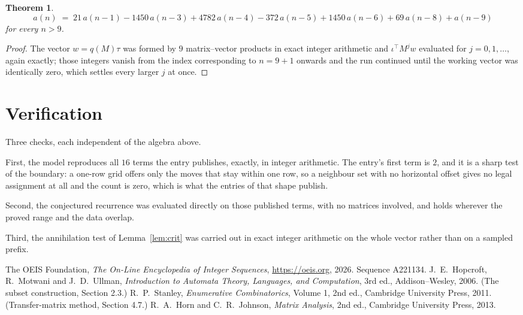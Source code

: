 \documentclass[11pt,a4paper]{article}
\theoremstyle{plain}
\newtheorem{theorem}{Theorem}
\theoremstyle{definition}
\begin{document}
\begin{theorem}
\[
a(n)\;=\;21\,a(n-1) - 1450\,a(n-3) + 4782\,a(n-4) - 372\,a(n-5) + 1450\,a(n-6) + 69\,a(n-8) + a(n-9)
\]
for every $n>9$.
\end{theorem}

\begin{proof}
The vector $w=q(M)\tau$ was formed by $9$ matrix--vector products in exact integer
arithmetic and $\iota^{\!\top}M^{j}w$ evaluated for $j=0,1,\dots$, again exactly; those
integers vanish from the index corresponding to $n=9+1$ onwards and the run continued
until the working vector was identically zero, which settles every larger $j$ at once.
\end{proof}

\section{Verification}

Three checks, each independent of the algebra above.

First, the model reproduces all $16$ terms the entry publishes, exactly, in integer
arithmetic. The entry's first term is $2$, and it is a sharp test of the boundary: a
one-row grid offers only the moves that stay within one row, so a neighbour set with no
horizontal offset gives no legal assignment at all and the count is zero, which is what the
entries of that shape publish.

Second, the conjectured recurrence was evaluated directly on those published terms, with no
matrices involved, and holds wherever the proved range and the data overlap.

Third, the annihilation test of Lemma~\ref{lem:crit} was carried out in exact integer
arithmetic on the whole vector rather than on a sampled prefix.

\begin{thebibliography}{9}
 The OEIS Foundation, \emph{The On-Line Encyclopedia of Integer
Sequences}, \url{https://oeis.org}, 2026. Sequence A221134.
 J.~E.~Hopcroft, R.~Motwani and J.~D.~Ullman, \emph{Introduction to Automata
Theory, Languages, and Computation}, 3rd ed., Addison--Wesley, 2006. (The subset
construction, Section 2.3.)
 R.~P.~Stanley, \emph{Enumerative Combinatorics}, Volume 1, 2nd ed.,
Cambridge University Press, 2011. (Transfer-matrix method, Section 4.7.)
 R.~A.~Horn and C.~R.~Johnson, \emph{Matrix Analysis}, 2nd ed., Cambridge
University Press, 2013.
\end{thebibliography}
\end{document}

